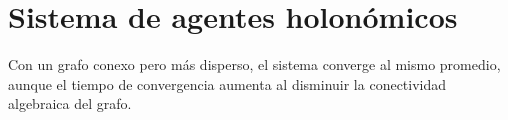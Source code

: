 \section{Sistema de agentes holonómicos}
Con un grafo conexo pero más disperso, el sistema converge al mismo promedio, aunque el tiempo de convergencia aumenta al disminuir la conectividad algebraica del grafo.
